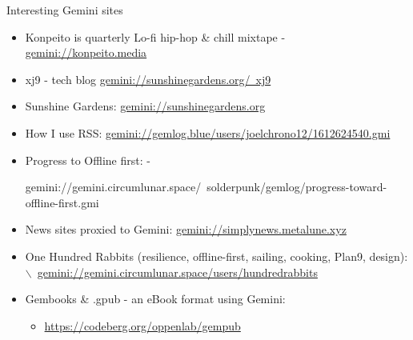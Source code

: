 \documentclass[presentation, 11pt,  aspectratio=169]{beamer}
\begin{document}
\begin{frame}[label={sec:org299d4cb}]{Interesting Gemini sites}
\begin{itemize}
\item \alert{Konpeito is quarterly Lo-fi hip-hop \& chill mixtape} - \href{gemini://konpeito.media}{gemini://konpeito.media}\\
\item \alert{xj9 - tech blog} \href{gemini://sunshinegardens.org/~xj9}{gemini://sunshinegardens.org/~xj9}\\
\item \alert{Sunshine Gardens:} \href{gemini://sunshinegardens.org}{gemini://sunshinegardens.org}\\
\item \alert{How I use RSS:} \href{gemini://gemlog.blue/users/joelchrono12/1612624540.gmi}{gemini://gemlog.blue/users/joelchrono12/1612624540.gmi} \\
\item \alert{Progress to Offline first:} -\\
\begin{small} gemini://gemini.circumlunar.space/~solderpunk/gemlog/progress-toward-offline-first.gmi
\end{small}
\item \alert{News sites proxied to Gemini:} \href{gemini://simplynews.metalune.xyz}{gemini://simplynews.metalune.xyz}\\
\item \alert{One Hundred Rabbits (resilience, offline-first, sailing, cooking, Plan9, design):}$\backslash$\ \href{gemini://gemini.circumlunar.space/users/hundredrabbits}{gemini://gemini.circumlunar.space/users/hundredrabbits}\\
\item \alert{Gembooks \& .gpub - an eBook format using Gemini:}\\
\begin{itemize}
\item \url{https://codeberg.org/oppenlab/gempub}\\
\end{itemize}
\end{itemize}
\end{frame}
\end{document}
